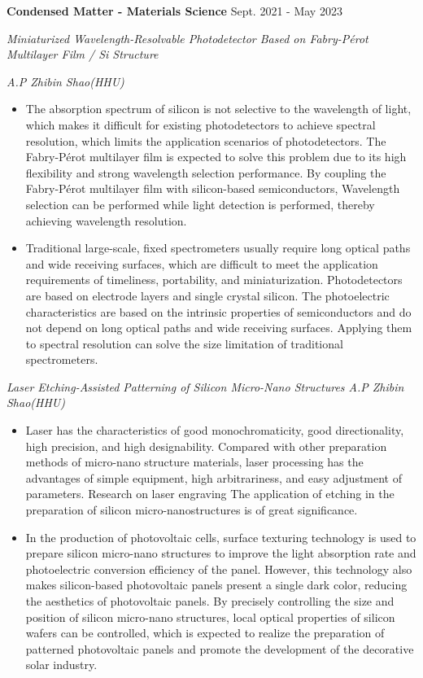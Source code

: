 \documentclass[12pt]{article}
\begin{document}
\medskip \textbf{Condensed Matter - Materials Science} \hfill Sept. 2021 - May 2023

\quad  \textit{Miniaturized Wavelength-Resolvable Photodetector Based on Fabry-P\'{e}rot Multilayer Film / Si Structure}

\hfill \textit{A.P Zhibin Shao(HHU)}

\begin{itemize}[noitemsep,nolistsep]
    \item The absorption spectrum of silicon is not selective to the wavelength of light, which makes it difficult for existing photodetectors to achieve spectral resolution, which limits the application scenarios of photodetectors. The Fabry-P\'{e}rot multilayer film is expected to solve this problem due to its high flexibility and strong wavelength selection performance. By coupling the Fabry-P\'{e}rot multilayer film with silicon-based semiconductors, Wavelength selection can be performed while light detection is performed, thereby achieving wavelength resolution.
    \item Traditional large-scale, fixed spectrometers usually require long optical paths and wide receiving surfaces, which are difficult to meet the application requirements of timeliness, portability, and miniaturization. Photodetectors are based on electrode layers and single crystal silicon. The photoelectric characteristics are based on the intrinsic properties of semiconductors and do not depend on long optical paths and wide receiving surfaces. Applying them to spectral resolution can solve the size limitation of traditional spectrometers.
\end{itemize}

\quad  \textit{Laser Etching-Assisted Patterning of Silicon Micro-Nano Structures \hfill A.P Zhibin Shao(HHU)}

\begin{itemize}[noitemsep,nolistsep]
    \item Laser has the characteristics of good monochromaticity, good directionality, high precision, and high designability. Compared with other preparation methods of micro-nano structure materials, laser processing has the advantages of simple equipment, high arbitrariness, and easy adjustment of parameters. Research on laser engraving The application of etching in the preparation of silicon micro-nanostructures is of great significance.
    \item In the production of photovoltaic cells, surface texturing technology is used to prepare silicon micro-nano structures to improve the light absorption rate and photoelectric conversion efficiency of the panel. However, this technology also makes silicon-based photovoltaic panels present a single dark color, reducing the aesthetics of photovoltaic panels. By precisely controlling the size and position of silicon micro-nano structures, local optical properties of silicon wafers can be controlled, which is expected to realize the preparation of patterned photovoltaic panels and promote the development of the decorative solar industry.
\end{itemize}
\end{document}
